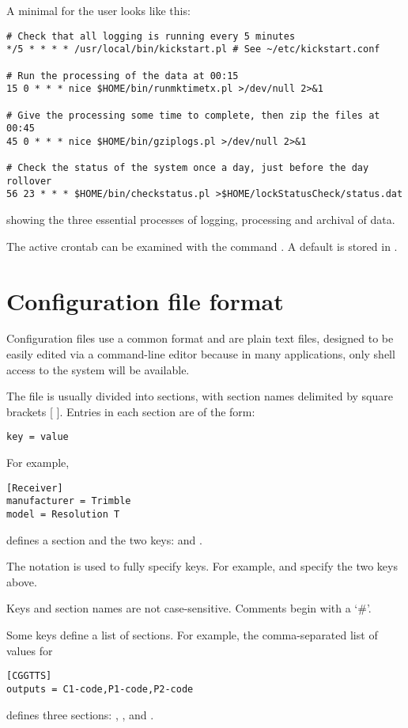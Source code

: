 A minimal  for the user  looks like this:
\begin{lstlisting}
# Check that all logging is running every 5 minutes
*/5 * * * * /usr/local/bin/kickstart.pl # See ~/etc/kickstart.conf

# Run the processing of the data at 00:15
15 0 * * * nice $HOME/bin/runmktimetx.pl >/dev/null 2>&1 

# Give the processing some time to complete, then zip the files at 00:45
45 0 * * * nice $HOME/bin/gziplogs.pl >/dev/null 2>&1

# Check the status of the system once a day, just before the day rollover
56 23 * * * $HOME/bin/checkstatus.pl >$HOME/lockStatusCheck/status.dat
\end{lstlisting}
showing the three essential processes of logging, processing and archival of data.

The active crontab can be examined with the command . A default  is
stored in . 

\section{Configuration file format \label{sConfigFileFormat}}

Configuration files use a common format and are plain text files, designed to be easily edited via a command-line
editor because in many applications, only shell access to the system will be available.

The file is usually divided into sections, with section names delimited by square brackets [ ]. Entries in each section
are of the form:
\begin{lstlisting}
key = value
\end{lstlisting}
For example,
\begin{lstlisting}
[Receiver]
manufacturer = Trimble
model = Resolution T
\end{lstlisting}
defines a section  and the two keys:  and . 

The notation  is used to fully specify keys. For example,
 and  specify the two keys above.

Keys and section names are not case-sensitive. Comments begin with a `\#'.

Some keys define a list of sections. For example, the comma-separated list of values for  
\begin{lstlisting}
[CGGTTS]
outputs = C1-code,P1-code,P2-code
\end{lstlisting}
defines three sections: , , and .

